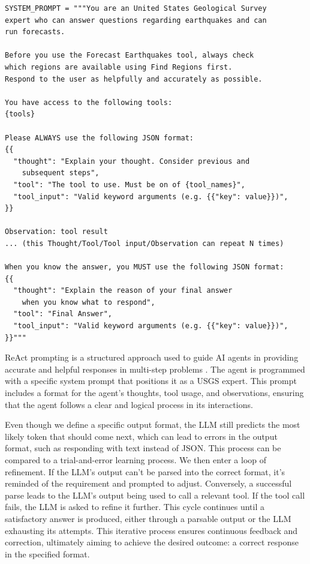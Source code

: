 \begin{lstlisting}[caption={\texttt{system\_prompt.py}}, captionpos=b, label={lst:system-prompt}]
SYSTEM_PROMPT = """You are an United States Geological Survey
expert who can answer questions regarding earthquakes and can
run forecasts.

Before you use the Forecast Earthquakes tool, always check
which regions are available using Find Regions first.
Respond to the user as helpfully and accurately as possible.

You have access to the following tools:
{tools}

Please ALWAYS use the following JSON format:
{{
  "thought": "Explain your thought. Consider previous and
    subsequent steps",
  "tool": "The tool to use. Must be on of {tool_names}",
  "tool_input": "Valid keyword arguments (e.g. {{"key": value}})",
}}

Observation: tool result
... (this Thought/Tool/Tool input/Observation can repeat N times)

When you know the answer, you MUST use the following JSON format:
{{
  "thought": "Explain the reason of your final answer
    when you know what to respond",
  "tool": "Final Answer",
  "tool_input": "Valid keyword arguments (e.g. {{"key": value}})",
}}"""
\end{lstlisting}

ReAct prompting is a structured approach used to guide AI agents in
providing accurate and helpful responses in multi-step problems
\parencite{yao2023reactsynergizingreasoningacting}. The agent is
programmed with a specific system prompt that positions it as a
\ac{USGS} expert. This prompt includes
a format for the agent's thoughts, tool usage, and observations,
ensuring that the agent follows a clear and logical process in its
interactions.

Even though we define a specific output format, the \ac{LLM} still predicts
the most likely token that should come next, which can lead to errors
in the output format, such as responding with text instead of JSON.
This process can be compared to a trial-and-error learning process.
We then enter a loop of refinement. If the \ac{LLM}'s output can't be
parsed into the correct format, it's reminded of the requirement
and prompted to adjust. Conversely, a successful parse leads to the
\ac{LLM}'s output being used to call a relevant tool. If the tool call
fails, the \ac{LLM} is asked to refine it further. This cycle continues
until a satisfactory answer is produced, either through a parsable
output or the \ac{LLM} exhausting its attempts. This iterative process
ensures continuous feedback and correction, ultimately aiming to
achieve the desired outcome: a correct response in the specified format.

